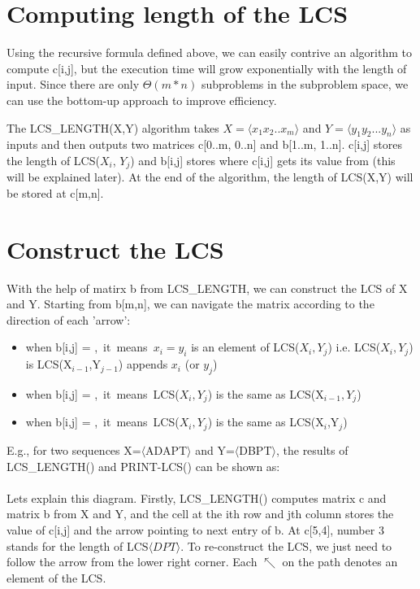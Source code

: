 \documentclass{report}
\begin{document}
    \section{Computing length of the LCS}
    Using the recursive formula defined above, we can easily contrive an algorithm to compute c[i,j], but the execution time will grow exponentially with the length of input. Since there are only $\Theta(m*n)$ subproblems in the subproblem space, we can use the bottom-up approach to improve efficiency.
    
    \bigskip
    The LCS\_LENGTH(X,Y) algorithm takes $X=\langle x_1x_2..x_m\rangle$ and $Y = \langle y_1y_2...y_n\rangle$ as inputs and then outputs two matrices c[0..m, 0..n] and b[1..m, 1..n]. c[i,j] stores the length of LCS($X_i$, $Y_j$) and b[i,j] stores where c[i,j] gets its value from (this will be explained later). At the end of the algorithm, the length of LCS(X,Y) will be stored at c[m,n].
    
    
    \newpage
    \section{Construct the LCS}
    With the help of matirx b from LCS\_LENGTH, we can construct the LCS of X and Y. Starting from b[m,n], we can navigate the matrix according to the direction of each 'arrow':
    \begin{itemize}
        \item when b[i,j] = \nwarrow,~it~means~$x_i=y_i$ is an element of LCS($X_i,Y_j$) i.e. LCS($X_i,Y_j$) is LCS(X$_{i-1}$,Y$_{j-1}$) appends $x_i$ (or $y_j$)
        \item when b[i,j] = \uparrow,~it~means~LCS($X_i,Y_j$) is the same as LCS(X$_{i-1},Y_j$)
        \item when b[i,j] = \leftarrow,~it~means~LCS($X_i,Y_j$) is the same as LCS(X$_i$,Y$_j$)
    \end{itemize}
    
    \newpage
    E.g., for two sequences X=$\langle$ADAPT$\rangle$ and Y=$\langle$DBPT$\rangle$, the results of LCS\_LENGTH() and PRINT-LCS() can be shown as:\\\\
    
    \bigskip
    Lets explain this diagram. Firstly, LCS\_LENGTH() computes matrix c and matrix b from X and Y, and the cell at the ith row and jth column stores the value of c[i,j] and the arrow pointing to next entry of b. At c[5,4], number 3 stands for the length of LCS$\langle DPT \rangle$. To re-construct the LCS, we just need to follow the arrow from the lower right corner. Each $\nwarrow$ on the path denotes an element of the LCS.
    
\end{document}
